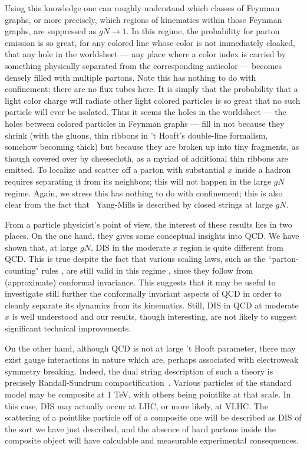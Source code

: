 Using this knowledge one can roughly understand which classes of
Feynman graphs, or more precisely, which regions of kinematics within
those Feynman graphs, are suppressed as $gN\to1$.  In this regime, the
probability for parton emission is so great, for any colored line
whose color is not immediately cloaked, that any hole in the
worldsheet --- any place where a color index is carried by something
physically separated from the corresponding anticolor --- becomes
densely filled with multiple partons.  Note this has nothing to do
with confinement; there are no flux tubes here.  It is simply that the
probability that a light color charge will radiate other light colored
particles is so great that no such particle will ever be isolated.
Thus it seems the holes in the worldsheet --- the holes between
colored particles in Feynman graphs --- fill in not because they
shrink (with the gluons, thin ribbons in 't Hooft's double-line
formalism, somehow becoming thick) but because they are broken up into
tiny fragments, as
though covered over by cheesecloth, 
as a myriad of additional thin ribbons are emitted.  To localize and scatter off a
parton with substantial $x$ inside a hadron requires separating it
from its neighbors; this will not happen in the large $gN$ regime.
Again, we stress this has nothing to do with confinement; this is also
clear from the fact that \nfour\ Yang-Mills is described by closed
strings at large $gN$.

 From a particle physicist's point of view, the interest of these
results lies in two places.  On the one hand, they gives some
conceptual insights into QCD.  We have
shown that, at large $gN$, DIS in the moderate $x$ region
is quite different from QCD.
This is true despite the fact that various scaling laws, such as
the ``parton-counting" rules \cite{bf,mmt}, are still valid
in this regime \cite{PShard}, since they follow from (approximate)
conformal invariance.  This suggests that it may be useful to
investigate still further the conformally invariant aspects of QCD
\cite{QCDcft} in order to cleanly separate its dynamics from its kinematics.
Still, DIS in QCD at moderate $x$ is well understood and our
results, though interesting, are not likely to suggest significant technical
improvements.

On the other hand, although QCD is not at large 't Hooft parameter, there may exist
gauge interactions in nature which
are, perhaps associated with electroweak
symmetry breaking.  Indeed, the dual string description of such a theory is
precisely Randall-Sundrum
compactification~\cite{rsone}. Various
particles of the standard model may be composite at 1 TeV,
with others being pointlike at that scale.   In this case,
DIS may actually occur at LHC, or more likely, at VLHC.
The scattering of a pointlike particle off
of a composite one will be described as DIS of the sort
we have just described, and the absence of hard partons inside
the composite object will have calculable and measurable
experimental consequences.

